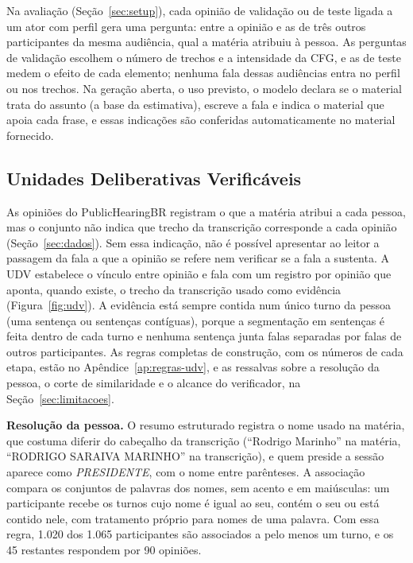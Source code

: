 Na avaliação (Seção~\ref{sec:setup}), cada opinião de validação ou de teste ligada a um ator com
perfil gera uma pergunta: entre a opinião e as de três outros participantes da mesma audiência, qual
a matéria atribuiu à pessoa. As perguntas de validação escolhem o número de trechos e a intensidade
da CFG, e as de teste medem o efeito de cada elemento; nenhuma fala dessas audiências entra no perfil
ou nos trechos. Na geração aberta, o uso previsto, o modelo declara se o material trata do assunto (a
base da estimativa), escreve a fala e indica o material que apoia cada frase, e essas indicações
são conferidas automaticamente no material fornecido.

\subsection{Unidades Deliberativas Verificáveis}
\label{sec:metodo-udv}

As opiniões do PublicHearingBR registram o que a matéria atribui a cada pessoa, mas o conjunto não
indica que trecho da transcrição corresponde a cada opinião (Seção~\ref{sec:dados}). Sem essa
indicação, não é possível apresentar ao leitor a passagem da fala a que a opinião se refere nem
verificar se a fala a sustenta. A UDV estabelece o vínculo entre opinião e fala com um registro por
opinião que aponta, quando existe, o trecho da transcrição usado como evidência
(Figura~\ref{fig:udv}). A evidência está sempre contida num único turno da pessoa (uma sentença ou
sentenças contíguas), porque a segmentação em sentenças é feita dentro de cada turno e nenhuma
sentença junta falas separadas por falas de outros participantes. As regras completas de construção,
com os números de cada etapa, estão no Apêndice~\ref{ap:regras-udv}, e as ressalvas sobre a
resolução da pessoa, o corte de similaridade e o alcance do verificador, na
Seção~\ref{sec:limitacoes}.

\textbf{Resolução da pessoa.} O resumo estruturado registra o nome usado na matéria, que costuma
diferir do cabeçalho da transcrição (``Rodrigo Marinho'' na matéria, ``RODRIGO SARAIVA MARINHO'' na
transcrição), e quem preside a sessão aparece como \textit{PRESIDENTE}, com o nome entre parênteses.
A associação compara os conjuntos de palavras dos nomes, sem acento e em maiúsculas: um participante
recebe os turnos cujo nome é igual ao seu, contém o seu ou está contido nele, com tratamento próprio
para nomes de uma palavra. Com essa regra, 1.020 dos 1.065 participantes são associados a pelo menos
um turno, e os 45 restantes respondem por 90 opiniões.

